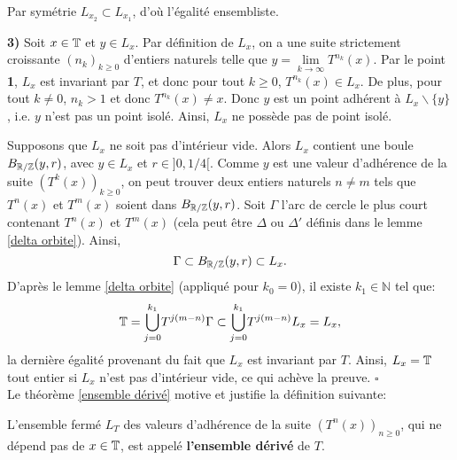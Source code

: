 	\par Par symétrie $L_{x_2}\subset L_{x_1}$, d'où l'égalité ensembliste.\\

	\par \textbf{3)} Soit $x\in {\mathbb{T}}$ et $y \in L_x$. Par définition de $L_x$, on a une suite strictement croissante $(n_k)_{k\geq0}$ d'entiers naturels telle que $y=\underset{k \to \infty}{\lim}T^{n_k}(x)$. Par le point \textbf{1}, $L_x$ est invariant par $T$, et donc pour tout $k\geq0$, $T^{n_k}(x) \in L_x$. De plus, pour tout $k\neq 0$, $n_k >1$ et donc $T^{n_k}(x)\neq x$. Donc $y$ est un point adhérent à $L_x\backslash\lbrace y \rbrace$, i.e. $y$ n'est pas un point isolé. Ainsi, $L_x$ ne possède pas de point isolé.\\
	\par Supposons que $L_x$ ne soit pas d'intérieur vide. Alors $L_x$ contient une boule $B_{{\mathbb{R}}/{\mathbb{Z}}}(y,r)$, avec $y\in L_x$ et $r\in ]0,1/4[$. Comme $y$ est une valeur d'adhérence de la suite $(T^k(x))_{k\geq0}$, on peut trouver deux entiers naturels $n\neq m$ tels que $T^n(x)$ et $T^m(x)$ soient dans $B_{{\mathbb{R}}/{\mathbb{Z}}}(y,r)$. Soit $\Gamma$ l'arc de cercle le plus court contenant $T^n(x)$ et $T^m(x)$ (cela peut être $\Delta$ ou $\Delta'$ définis dans le lemme \ref{delta orbite}). Ainsi,
	 $$\Gamma \subset B_{{\mathbb{R}}/{\mathbb{Z}}}(y,r) \subset L_x.$$
	  D'après le lemme \ref{delta orbite} (appliqué pour $k_0=0$), il existe $k_1 \in \mathbb{N}$ tel que:
	$${\mathbb{T}}=\overset{k_1}{\underset{j=0}{\bigcup}}T^{j(m-n)}\Gamma
			\subset \overset{k_1}{\underset{j=0}{\bigcup}}T^{j(m-n)} L_x = L_x,$$
	la dernière égalité provenant du fait que $L_x$ est invariant par $T$. Ainsi, $L_x = {\mathbb{T}}$ tout entier si $L_x$ n'est pas d'intérieur vide, ce qui achève la preuve.	\hfill $\square$\\













Le théorème \ref{ensemble dérivé} motive et justifie la définition suivante:

\begin{definition}
	L'ensemble fermé $L_T$ des valeurs d'adhérence de la suite $(T^n(x))_{n\geq 0}$, qui ne dépend pas de $x \in {\mathbb{T}}$, est appelé \textbf{l'ensemble dérivé} de $T$.
\end{definition}






